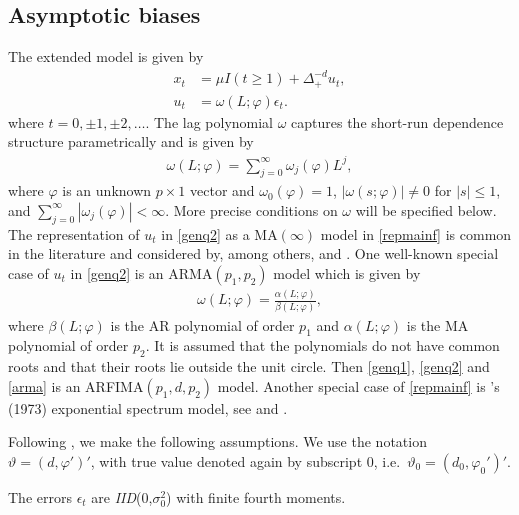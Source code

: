 {{\subsection{Asymptotic biases} \label{theorygen}

The extended model is given by 
\begin{align}
    x_t &= \mu I(t \geq 1) + \Delta_+^{-d} u_t, \label{genq1}\\
    u_t &= \omega(L;\varphi) \epsilon_t. \label{genq2}
\end{align} 
where $t = 0,\pm 1,\pm 2,\ldots $. The lag polynomial $\omega$ captures the short-run dependence structure parametrically and is given by 
\begin{align}
     \omega(L;\varphi) = \sum_{j = 0}^{\infty} \omega_j(\varphi) L^j, \label{repmainf}
\end{align}
where $\varphi$ is an unknown $p\times1$ vector and $\omega_0(\varphi) = 1$, $|\omega(s;\varphi)| \neq 0$ for $|s| \leq 1$, and $\sum_{j = 0}^{\infty} |\omega_j(\varphi)| < \infty$. More precise conditions on $\omega$  will be specified below.
The representation of $u_t$ in \eqref{genq2} as a MA$(\infty)$ model in \eqref{repmainf} is common in the literature and considered by, among others, \textcite{hualde2011gaussian} and \textcite{hualde2020truncated,hualde2021truncated}. One well-known special case of $u_t$ in \eqref{genq2} is an ARMA$(p_1,p_2)$ model which is given by 
\begin{align}
    \omega(L;\varphi) = \frac{\alpha(L;\varphi)}{\beta(L;\varphi)}, \label{arma}
\end{align}
where $\beta(L;\varphi)$ is the AR polynomial of order $p_1$ and  $\alpha(L;\varphi)$ is the MA polynomial of order $p_2$. It is assumed that the polynomials do not have common roots and that their roots lie outside the unit circle. Then \eqref{genq1}, \eqref{genq2} and \eqref{arma} is an ARFIMA$(p_1,d,p_2)$ model. Another special case of \eqref{repmainf} is \citeauthor{bloomfield1973exponential}'s (1973) exponential spectrum model, see \textcite{robinson1994efficient} and \textcite{hassler2019time}. 

Following \textcite{hualde2020truncated}, we make the following assumptions. We use the notation $\vartheta = (d,\varphi')'$, with true value denoted again by subscript 0, i.e.\ $\vartheta_0 = (d_0,\varphi_0')'$. 



\begin{assumption}\label{A2}
The errors $\epsilon_t$ are \textit{IID}(0,$\sigma_0^2$) with finite fourth moments.
\end{assumption}




}}
